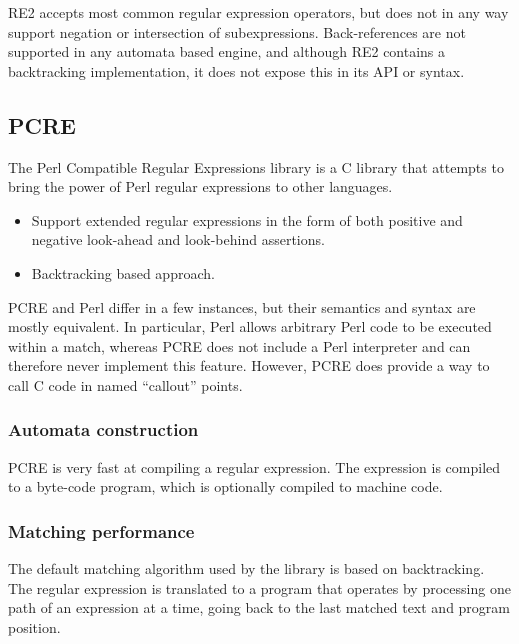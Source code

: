 RE2 accepts most common regular expression operators, but does not in any way
support negation or intersection of subexpressions. Back-references are not
supported in any automata based engine, and although RE2 contains a backtracking
implementation, it does not expose this in its API or syntax.


\subsection{PCRE}

The Perl Compatible Regular Expressions library is a C library that attempts to
bring the power of Perl regular expressions to other languages.

\begin{itemize}

   \item Support extended regular expressions in the form of both positive and
      negative look-ahead and look-behind assertions.

   \item Backtracking based approach.

\end{itemize}

PCRE and Perl differ in a few instances, but their semantics and syntax are
mostly equivalent. In particular, Perl allows arbitrary Perl code to be executed
within a match, whereas PCRE does not include a Perl interpreter and can
therefore never implement this feature. However, PCRE does provide a way to call
C code in named ``callout'' points.

\subsubsection{Automata construction}

PCRE is very fast at compiling a regular expression. The expression is compiled
to a byte-code program, which is optionally compiled to machine code.


\subsubsection{Matching performance}

The default matching algorithm used by the library is based on backtracking. The
regular expression is translated to a program that operates by processing one
path of an expression at a time, going back to the last matched text and program
position.


